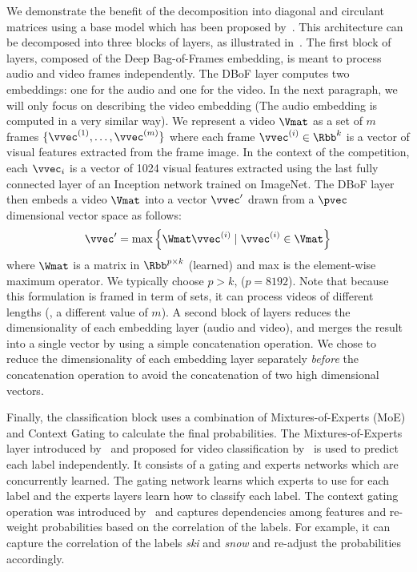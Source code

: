 We demonstrate the benefit of the decomposition into diagonal and circulant matrices using a base model which has been proposed by~\citet{miech2017learnable}.
This architecture can be decomposed into three blocks of layers, as illustrated in~. 
The first block of layers, composed of the Deep Bag-of-Frames embedding, is meant to process audio and video frames independently.
The DBoF layer computes two embeddings: one for the audio and one for the video.
In the next paragraph, we will only focus on describing the video embedding (The audio embedding is computed in a very similar way).
We represent a video $\Vmat$ as a set of $m$ frames $\{\vvec^{(1)}, \ldots, \vvec^{(m)}\}$ where each frame $\vvec^{(i)} \in \Rbb^k$ is a vector of visual features extracted from the frame image.
In the context of the \yt competition, each $\vvec_i$ is a vector of 1024 visual features extracted using the last fully connected layer of an Inception network trained on ImageNet.
The DBoF layer then embeds a video $\Vmat$ into a vector $\vvec'$ drawn from a $\pvec$ dimensional vector space as follows:
\begin{equation}
  \vvec' = \max \left\{\Wmat \vvec^{(i)} \mid \vvec^{(i)} \in \Vmat \right\}
\end{equation}
where $\Wmat$ is a matrix in $\Rbb^{p \times k}$ (learned) and max is the element-wise maximum operator.
We typically choose $p > k$, (\eg $p = 8192$).
Note that because this formulation is framed in term of sets, it can process videos of different lengths (\ie, a different value of $m$).
A second block of layers reduces the dimensionality of each embedding layer (audio and video), and merges the result into a single vector by using a simple concatenation operation.
We chose to reduce the dimensionality of each embedding layer separately \emph{before} the concatenation operation to avoid the concatenation of two high dimensional vectors.

Finally, the classification block uses a combination of Mixtures-of-Experts (MoE) and Context Gating to calculate the final probabilities.
The Mixtures-of-Experts layer introduced by~\citet{jordan1993hierarchical} and proposed for video classification by~\citet{abu2016youtube} is used to predict each label independently.
It consists of a gating and experts networks which are concurrently learned.
The gating network learns which experts to use for each label and the experts layers learn how to classify each label.
The context gating operation was introduced by~\citet{miech2017learnable} and captures dependencies among features and re-weight probabilities based on the correlation of the labels.
For example, it can capture the correlation of the labels \emph{ski} and \emph{snow} and re-adjust the probabilities accordingly. 


